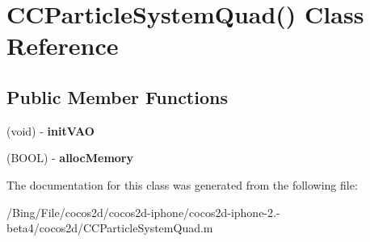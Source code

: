 \hypertarget{interface_c_c_particle_system_quad_07_08}{\section{C\-C\-Particle\-System\-Quad() Class Reference}
\label{interface_c_c_particle_system_quad_07_08}
}
\subsection*{Public Member Functions}
\begin{DoxyCompactItemize}
\item 
\hypertarget{interface_c_c_particle_system_quad_07_08_a3efc79e3bc9bd2c650da8bfe1a90b8e5}{(void) -\/ {\bfseries init\-V\-A\-O}}\label{interface_c_c_particle_system_quad_07_08_a3efc79e3bc9bd2c650da8bfe1a90b8e5}

\item 
\hypertarget{interface_c_c_particle_system_quad_07_08_a3b1eb9e654d49c630b0d5a2a0d04fe3a}{(B\-O\-O\-L) -\/ {\bfseries alloc\-Memory}}\label{interface_c_c_particle_system_quad_07_08_a3b1eb9e654d49c630b0d5a2a0d04fe3a}

\end{DoxyCompactItemize}


The documentation for this class was generated from the following file\-:\begin{DoxyCompactItemize}
\item 
/\-Bing/\-File/cocos2d/cocos2d-\/iphone/cocos2d-\/iphone-\/2.-\/beta4/cocos2d/C\-C\-Particle\-System\-Quad.\-m\end{DoxyCompactItemize}
